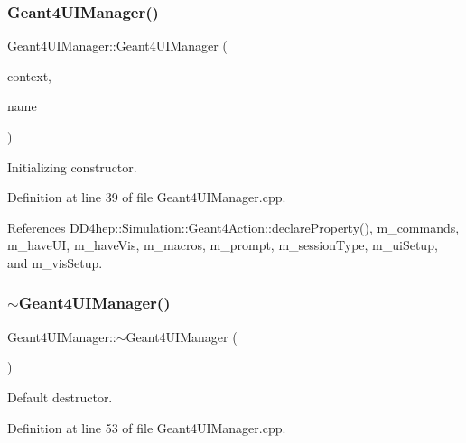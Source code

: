 \subsubsection{\texorpdfstring{Geant4\+U\+I\+Manager()}{Geant4UIManager()}}
{\footnotesize\ttfamily Geant4\+U\+I\+Manager\+::\+Geant4\+U\+I\+Manager (\begin{DoxyParamCaption}\item[{\hyperlink{class_d_d4hep_1_1_simulation_1_1_geant4_context}{Geant4\+Context} $\ast$}]{context,  }\item[{const std\+::string \&}]{name }\end{DoxyParamCaption})}



Initializing constructor. 



Definition at line 39 of file Geant4\+U\+I\+Manager.\+cpp.



References D\+D4hep\+::\+Simulation\+::\+Geant4\+Action\+::declare\+Property(), m\+\_\+commands, m\+\_\+have\+UI, m\+\_\+have\+Vis, m\+\_\+macros, m\+\_\+prompt, m\+\_\+session\+Type, m\+\_\+ui\+Setup, and m\+\_\+vis\+Setup.

\hypertarget{class_d_d4hep_1_1_simulation_1_1_geant4_u_i_manager_af668d960c771504a66490bdf8f0aebd8}{}\label{class_d_d4hep_1_1_simulation_1_1_geant4_u_i_manager_af668d960c771504a66490bdf8f0aebd8} 
\subsubsection{\texorpdfstring{$\sim$\+Geant4\+U\+I\+Manager()}{~Geant4UIManager()}}
{\footnotesize\ttfamily Geant4\+U\+I\+Manager\+::$\sim$\+Geant4\+U\+I\+Manager (\begin{DoxyParamCaption}{ }\end{DoxyParamCaption})\hspace{0.3cm}{\ttfamily [virtual]}}



Default destructor. 



Definition at line 53 of file Geant4\+U\+I\+Manager.\+cpp.



